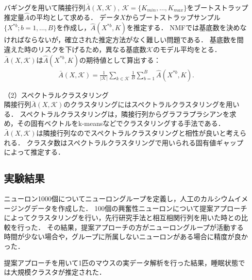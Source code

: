 \documentclass[
  11pt, %
  twocolumn, %
  headings=small, %
]{scrartcl} \usepackage[
\begin{document}
バギングを用いて隣接行列$\bar{A}(X, \mathcal{K}), \ \mathcal{K} = \{K_{min}, \dots, K_{max}\}$をブートストラップ推定量$\hat{A}$の平均として求める．
データ$X$からブートストラップサンプル$\{X^{*b}; b = 1,\dots, B\}$を作成し，$\hat{A}(X^{*b},K)$を推定する．
NMFでは基底数を決めなければならないが，確立された推定方法がなく難しい問題である．
基底数を間違えた時のリスクを下げるため，異なる基底数$\mathcal{K}$のモデル平均をとる．
$\bar{A}(X, \mathcal{K})$は$\hat{A}(X^{*b},K)$の期待値として算出する：
\begin{align}
	\bar{A}(X,\mathcal{K}) = \frac{1}{|\mathcal{K}|} \sum_{k \in \mathcal{K}} \frac{1}{B} \sum_{b=1}^B \hat{A}(X^{*b}, K).
\end{align}

\noindent（2）スペクトラルクラスタリング\\
隣接行列$\bar{A}(X, \mathcal{K})$のクラスタリングにはスペクトラルクラスタリングを用いる．
スペクトラルクラスタリングは，隣接行列からグラフラプラシアンを求め，その固有ベクトルをk-meansなどでクラスタリングする手法である．
$\bar{A}(X, \mathcal{K})$は隣接行列なのでスペクトラルクラスタリングと相性が良いと考えられる．
クラスタ数はスペクトラルクラスタリングで用いられる固有値ギャップによって推定する．
\subsection*{実験結果}
ニューロン1000個についてニューロングループを定義し，人工のカルシウムイメージングデータを作成した．
100個の興奮性ニューロンについて提案アプローチによってクラスタリングを行い，先行研究手法と相互相関行列を用いた時との比較を行った．
その結果，提案アプローチの方がニューロングループが活動する時間が少ない場合や，グループに所属しないニューロンがある場合に精度が良かった．

提案アプローチを用いて1匹のマウスの実データ解析を行った結果，睡眠状態では大規模クラスタが推定された．
\end{document}
